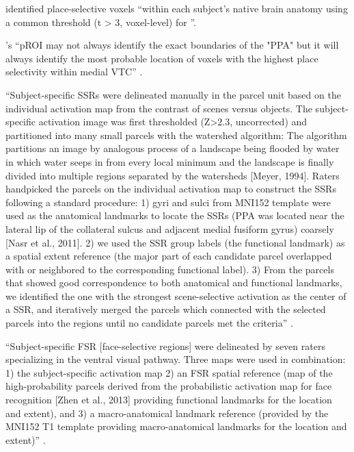 \citet{weiner2018defining} identified place-selective voxels ``within each
subject's native brain anatomy using a common threshold (t > 3, voxel-level) for
''.

\citet{weiner2018defining}'s ``pROI may not always identify the exact boundaries
of the "PPA" but it will always identify the most probable location of voxels
with the highest place selectivity within medial VTC''
\citep{weiner2018defining}.



``Subject-specific SSRs were delineated manually in the parcel unit based on the
individual activation map from the contrast of scenes versus objects.
%
The subject-specific activation image was first thresholded (Z>2.3, uncorrected)
and partitioned into many small parcels with the watershed algorithm:
%
The algorithm partitions an image by analogous process of a landscape being
flooded by water in which water seeps in from every local minimum and the
landscape is finally divided into multiple regions separated by the watersheds
[Meyer, 1994].
%
Raters handpicked the parcels on the individual activation map to construct the
SSRs following a standard procedure:
%
1) gyri and sulci from MNI152 template were used as the anatomical landmarks to
locate the SSRs (PPA was located near the lateral lip of the collateral sulcus
and adjacent medial fusiform gyrus) coarsely [Nasr et al., 2011].
%
2) we used the SSR group labels (the functional landmark) as a spatial extent
reference (the major part of each candidate parcel overlapped with or neighbored
to the corresponding functional label).
%
3) From the parcels that showed good correspondence to both anatomical and
functional landmarks, we identified the one with the strongest scene-selective
activation as the center of a SSR, and iteratively merged the parcels which
connected with the selected parcels into the regions until no candidate parcels
met the criteria'' \citet{zhen2017quantifying}.

``Subject-specific FSR [face-selective regions] were delineated by seven raters
specializing in the ventral visual pathway.
%
Three maps were used in combination:
%
1) the subject-specific activation map
%
2) an FSR spatial reference (map of the high-probability parcels derived from
the probabilistic activation map for face recognition [Zhen et al.,
2013] providing functional landmarks for the location and extent), and
%
3) a macro-anatomical landmark reference (provided by the MNI152 T1 template
providing macro-anatomical landmarks for the location and extent)''
\citet{zhen2015quantifying}.

